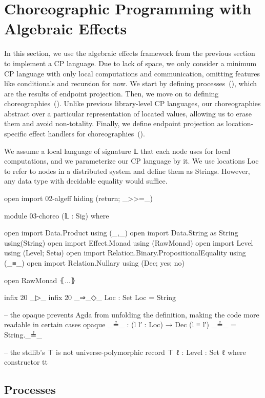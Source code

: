 \section{Choreographic Programming with Algebraic Effects}
\label{sec:cp-alg-eff}

In this section, we use the algebraic effects framework from the previous section to implement a CP language.
%
Due to lack of space, we only consider a minimum CP language with only local computations and communication, omitting features like conditionals and recursion for now.
%
We start by defining processes~(), which are the results of endpoint projection.
%
Then, we move on to defining choreographies~().
%
Unlike previous library-level CP languages, our choreographies abstract over a particular representation of located values, allowing us to erase them and avoid non-totality.
%
Finally, we define endpoint projection as location-specific effect handlers for choreographies~().

We assume a local language of signature 𝕃 that each node uses for local computations, and we parameterize our CP language by it.
%
We use locations Loc to refer to nodes in a distributed system and define them as Strings.
%
However, any data type with decidable equality would suffice.

\begin{code}[hide]
open import 02-algeff hiding (return; _>>=_)

module 03-choreo (𝕃 : Sig) where

open import Data.Product using (_,_)
open import Data.String as String using(String)
open import Effect.Monad using (RawMonad)
open import Level using (Level; Setω)
open import Relation.Binary.PropositionalEquality using (_≡_)
open import Relation.Nullary using (Dec; yes; no)

open RawMonad ⦃...⦄

infix 20 _▷_
infix 20 _⇒_◇_
Loc : Set
Loc = String

-- the opaque prevents Agda from unfolding the definition, making the code more readable in certain cases
opaque
  _≟_ : (l l′ : Loc) → Dec (l ≡ l′)
  _≟_ = String._≟_

-- the stdlib's ⊤ is not universe-polymorphic
record ⊤ {ℓ : Level} : Set ℓ where
  constructor tt
\end{code}

\subsection{Processes}
\label{sec:process}

